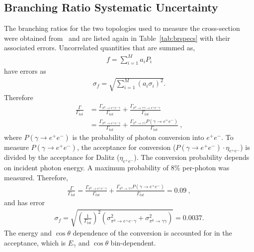  \subsection{Branching Ratio Systematic Uncertainty}
 The branching ratios for the two topologies used to measure the cross-section were obtained from~\cite{pdg2014} and are listed again in Table~\ref{tab:brspecs} with their associated errors. Uncorrelated quantities that are summed as,
 \begin{align}
 	f = \sum_{i = 1}^{M}a_iP_i  
 \end{align}
 have errors as
 \begin{align}
 	\sigma_f = \sqrt{\sum_{i = 1}^{M}\left(a_i\sigma_i\right)^2}.  
 \end{align}
 Therefore
 \begin{align}
 	\frac{\Gamma}{\Gamma_{tot}} &  = \frac{\Gamma_{\pi^{0}\rightarrow e^{+}e^{-}\gamma}}{\Gamma_{tot}} + \frac{\Gamma_{\pi^{0}\rightarrow \gamma \gamma \to e^{+}e^{-}\gamma}}{\Gamma_{tot}}  \\ & = \frac{\Gamma_{\pi^{0}\rightarrow e^{+}e^{-}\gamma}}{\Gamma_{tot}} + \frac{\Gamma_{\pi^{0}\rightarrow \gamma \gamma}P(\gamma \to  e^{+}e^{-})}{\Gamma_{tot}} \ ,
 \end{align}
 where $P(\gamma \to  e^{+}e^{-})$ is the probability of photon conversion into $e^+e^-$. To measure $P(\gamma \to  e^{+}e^{-})$, the acceptance for conversion ($P(\gamma \to  e^{+}e^{-})\cdot\eta_{e^+e^-}$) is divided by the acceptance for Dalitz ($\eta_{e^+e^-}$). The conversion probability depends on incident photon energy. A maximum probability of 8\%  per-photon was measured.
 	Therefore,
 	\begin{align}
 		\frac{\Gamma}{\Gamma_{tot}} = \frac{\Gamma_{\pi^{0}\rightarrow e^{+}e^{-}\gamma}}{\Gamma_{tot}} + \frac{\Gamma_{\pi^{0}\rightarrow \gamma \gamma}P(\gamma \to  e^{+}e^{-})}{\Gamma_{tot}} = 0.09 \ ,
 	\end{align}
 	and has error
 	\begin{align}
 		\sigma_f = \sqrt{\left(\frac{1}{\Gamma_{tot}}\right)^2(\sigma^2_{\pi^{0}\rightarrow e^{+}e^{-}\gamma} + \sigma^2_{\pi^{0}\rightarrow \gamma \gamma})  } = 0.0037.  
 	\end{align}
 	The energy and $\cos \theta$ dependence of the conversion is accounted for in the acceptance, which is $E_\gamma$ and $\cos \theta$ bin-dependent. 
 	